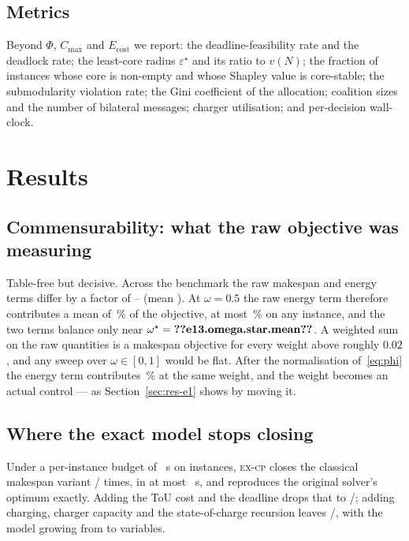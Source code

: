 \documentclass[preprint, 3p, review, 12pt]{elsarticle}
\theoremstyle{definition}
\begin{document}
\subsection{Metrics}
Beyond $\Phi$, $C_{\max}$ and $E_{\mathrm{cost}}$ we report: the deadline-feasibility rate and
the deadlock rate; the least-core radius $\varepsilon^\star$ and its ratio to $v(N)$; the
fraction of instances whose core is non-empty and whose Shapley value is core-stable; the
submodularity violation rate; the Gini coefficient of the allocation; coalition sizes and the
number of bilateral messages; charger utilisation; and per-decision wall-clock.

\section{Results}
\label{sec:results}

\subsection{Commensurability: what the raw objective was measuring}
\label{sec:res-e13}
Table-free but decisive. Across the benchmark the raw makespan and energy terms differ by a
factor of -- (mean ). At
$\omega=0.5$ the raw energy term therefore contributes a mean of
\,\% of the objective, at most
\,\% on any instance, and the two terms balance only near
$\omega^\star=\jnum{e13.omega.star.mean}$. A weighted sum on the raw quantities is a makespan
objective for every weight above roughly $0.02$, and any sweep over $\omega\in[0,1]$ would be
flat. After the normalisation of~\eqref{eq:phi} the energy term contributes
\,\% at the same weight, and the weight becomes an actual
control --- as Section~\ref{sec:res-e1} shows by moving it.

\subsection{Where the exact model stops closing}
\label{sec:res-exact}
Under a per-instance budget of ~s on  instances,
\textsc{ex-cp} closes the classical makespan variant
/ times, in at most
~s, and reproduces the original solver's optimum exactly.
Adding the ToU cost and the deadline drops that to
/; adding charging, charger capacity and the
state-of-charge recursion leaves /, with the model
growing from  to  variables.
\end{document}
